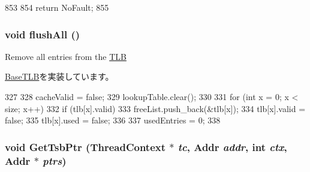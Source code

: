 \begin{DoxyCode}
853 {
854     return NoFault;
855 }
\end{DoxyCode}
\hypertarget{classSparcISA_1_1TLB_aca1483a67aee5a91e442f7131d66bcbd}{
\subsubsection[{flushAll}]{\setlength{\rightskip}{0pt plus 5cm}void flushAll ()}}
\label{classSparcISA_1_1TLB_aca1483a67aee5a91e442f7131d66bcbd}
Remove all entries from the \hyperlink{classSparcISA_1_1TLB}{TLB} 

\hyperlink{classBaseTLB_a5958bc92949a47d1be1088468abdc006}{BaseTLB}を実装しています。


\begin{DoxyCode}
327 {
328     cacheValid = false;
329     lookupTable.clear();
330 
331     for (int x = 0; x < size; x++) {
332         if (tlb[x].valid)
333             freeList.push_back(&tlb[x]);
334         tlb[x].valid = false;
335         tlb[x].used = false;
336     }
337     usedEntries = 0;
338 }
\end{DoxyCode}
\hypertarget{classSparcISA_1_1TLB_ab52a39898286d036febd5dcb6d0b376a}{
\subsubsection[{GetTsbPtr}]{\setlength{\rightskip}{0pt plus 5cm}void GetTsbPtr ({\bf ThreadContext} $\ast$ {\em tc}, \/  {\bf Addr} {\em addr}, \/  int {\em ctx}, \/  {\bf Addr} $\ast$ {\em ptrs})}}
\label{classSparcISA_1_1TLB_ab52a39898286d036febd5dcb6d0b376a}



